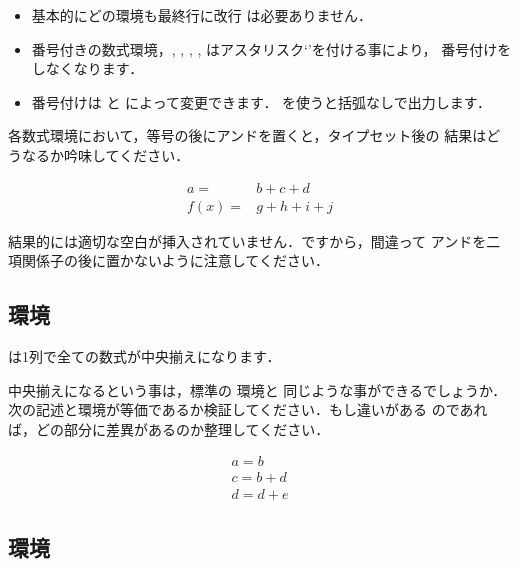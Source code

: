\begin{itemize}
\item 基本的にどの環境も最終行に改行 \texttt{\bs\bs} は必要ありません．
\item 番号付きの数式環境，, , , 
  ,  はアスタリスク`\str*'を付ける事により，
番号付けをしなくなります．
\item 番号付けは  と  によって変更できます．
 を使うと括弧なしで出力します．
\end{itemize}



\begin{Prob}
各数式環境において，等号の後にアンドを置くと，タイプセット後の
結果はどうなるか吟味してください．

\begin{InOut}
\begin{align}
   a =& b + c + d \\
f(x) =& g + h + i + j
\end{align}  
\end{InOut}

結果的には適切な空白が挿入されていません．ですから，間違って
アンドを二項関係子の後に置かないように注意してください．
\end{Prob}


\subsection{環境}

は1列で全ての数式が中央揃えになります．

\begin{Prob}
中央揃えになるという事は，\LaTeXe 標準の 環境と
同じような事ができるでしょうか．
次の記述と環境が等価であるか検証してください．もし違いがある
のであれば，どの部分に差異があるのか整理してください．

\begin{InTeX}
\begin{eqnarray*}
& a = b & \\
& c = b + d & \\
& d = d + e & 
\end{eqnarray*}
\end{InTeX}
\end{Prob}


\subsection{環境}

